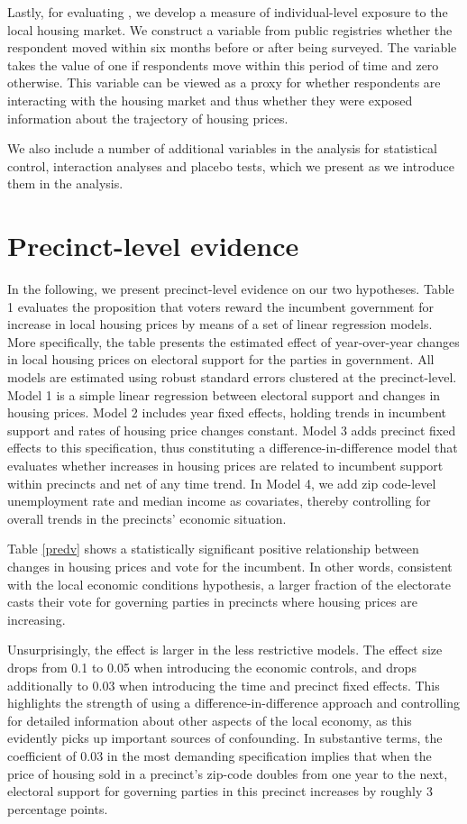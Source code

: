 \documentclass[12pt,a4paper]{article}
\begin{document}
	Lastly, for evaluating \htwo, we develop a measure of individual-level exposure to the local housing market. We construct a variable from public registries whether the respondent moved within six months before or after being surveyed. The variable takes the value of one if respondents move within this period of time and zero otherwise. This variable can be viewed as a proxy for whether respondents are interacting with the housing market and thus whether they were exposed information about the trajectory of housing prices.
	
	We also include a number of additional variables in the analysis for statistical control, interaction analyses and placebo tests, which we present as we introduce them in the analysis. 
	
	\section{Precinct-level evidence}
	In the following, we present precinct-level evidence on our two hypotheses. Table 1 evaluates the proposition that voters reward the incumbent government for increase in local housing prices by means of a set of linear regression models. More specifically, the table presents the estimated effect of year-over-year changes in local housing prices on electoral support for the parties in government. All models are estimated using robust standard errors clustered at the precinct-level. Model 1 is a simple linear regression between electoral support and changes in housing prices. Model 2 includes year fixed effects, holding trends in incumbent support and rates of housing price changes constant. Model 3 adds precinct fixed effects to this specification, thus constituting a difference-in-difference model that evaluates whether increases in housing prices are related to incumbent support within precincts and net of any time trend. In Model 4, we add zip code-level unemployment rate and median income as covariates, thereby controlling for overall trends in the precincts’ economic situation. 
	
	
	
	Table \ref{predv} shows a statistically significant positive relationship between changes in housing prices and vote for the incumbent. In other words, consistent with the local economic conditions hypothesis, a larger fraction of the electorate casts their vote for governing parties in precincts where housing prices are increasing. 
	
	Unsurprisingly, the effect is larger in the less restrictive models. The effect size drops from 0.1 to 0.05 when introducing the economic controls, and drops additionally to 0.03 when introducing the time and precinct fixed effects. This highlights the strength of using a difference-in-difference approach and controlling for detailed information about other aspects of the local economy, as this evidently picks up important sources of confounding. In substantive terms, the coefficient of 0.03 in the most demanding specification implies that when the price of housing sold in a precinct's zip-code doubles from one year to the next, electoral support for governing parties in this precinct increases by roughly 3 percentage points.
	
\end{document}
